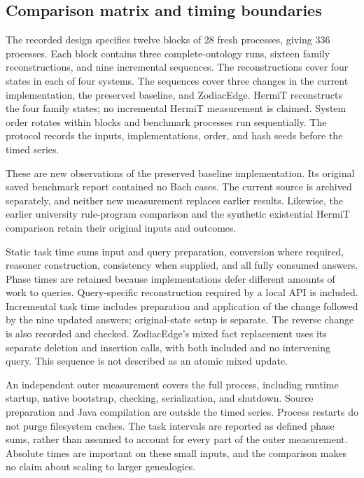 \subsection{Comparison matrix and timing boundaries}

The recorded design specifies twelve blocks of 28 fresh processes, giving
336 processes. Each block contains three complete-ontology runs, sixteen
family reconstructions, and nine incremental sequences. The reconstructions
cover four states in each of four systems. The sequences cover three changes
in the current implementation, the preserved baseline, and ZodiacEdge.
HermiT reconstructs the four family states; no incremental HermiT measurement
is claimed. System order rotates within blocks and benchmark processes run
sequentially. The protocol records the inputs, implementations, order, and
hash seeds before the timed series.

These are new observations of the preserved baseline implementation. Its
original saved benchmark report contained no Bach cases. The current source
is archived separately, and neither new measurement replaces earlier results.
Likewise, the earlier university rule-program comparison and the synthetic
existential HermiT comparison retain their original inputs and outcomes.

Static task time sums input and query preparation, conversion where required,
reasoner construction, consistency when supplied, and all fully consumed
answers. Phase times are retained because implementations defer different
amounts of work to queries. Query-specific reconstruction required by a local
API is included. Incremental task time includes preparation and application
of the change followed by the nine updated answers; original-state setup is
separate. The reverse change is also recorded and checked. ZodiacEdge's
mixed fact replacement uses its separate deletion and insertion calls, with
both included and no intervening query. This sequence is not described as an
atomic mixed update.

An independent outer measurement covers the full process, including runtime
startup, native bootstrap, checking, serialization, and shutdown. Source
preparation and Java compilation are outside the timed series. Process
restarts do not purge filesystem caches. The task intervals are reported as
defined phase sums, rather than assumed to account for every part of the
outer measurement. Absolute times are important on these small inputs, and
the comparison makes no claim about scaling to larger genealogies.

